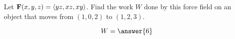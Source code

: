 \documentclass{ximera}
\author{David Guichard \and Neal Koblitz \and H. Jerome Keisler \and Albert Scheller \and Barry Balof \and Mike Wills \and Matthew Carr}
\begin{document}
\begin{exercise}




Let $\mathbf{F}(x,y,z)=\left\langle yz,xz,xy\right\rangle$. Find the work $W$ done by this force field on an object that moves from $(1,0,2)$ to $(1,2,3)$.

\begin{prompt}
\[
W=\answer{6}
\]
\end{prompt}

\end{exercise}
\end{document}
